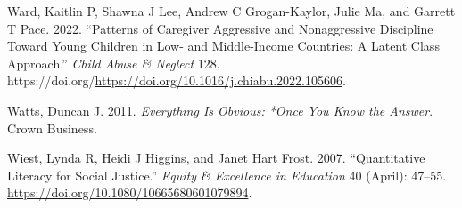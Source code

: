 \documentclass[
  letterpaper,
  DIV=11,
  numbers=noendperiod]{scrreprt}
\newlength{\cslhangindent}
\newlength{\cslentryspacingunit} %
\newenvironment{CSLReferences}[2] %
 {%
  \setlength{\parindent}{0pt}
  \ifodd #1
  \let\oldpar\par
  \def\par{\hangindent=\cslhangindent\oldpar}
  \fi
  \setlength{\parskip}{#2\cslentryspacingunit}
 }%
 {}
\begin{document}
\begin{CSLReferences}{1}{0}
\leavevmode{}%
Ward, Kaitlin P, Shawna J Lee, Andrew C Grogan-Kaylor, Julie Ma, and
Garrett T Pace. 2022. {``{Patterns of Caregiver Aggressive and
Nonaggressive Discipline Toward Young Children in Low- and Middle-Income
Countries: A Latent Class Approach}.''} \emph{Child Abuse \& Neglect}
128. https://doi.org/\url{https://doi.org/10.1016/j.chiabu.2022.105606}.

\leavevmode{}%
Watts, Duncan J. 2011. \emph{Everything Is Obvious: *Once You Know the
Answer}. Crown Business.

\leavevmode{}%
Wiest, Lynda R, Heidi J Higgins, and Janet Hart Frost. 2007.
{``Quantitative Literacy for Social Justice.''} \emph{Equity \&
Excellence in Education} 40 (April): 47--55.
\url{https://doi.org/10.1080/10665680601079894}.

\end{CSLReferences}
\end{document}
